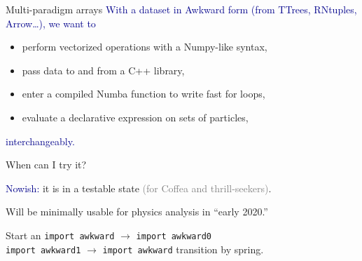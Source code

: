 \documentclass[aspectratio=169]{beamer}
\begin{document}
\begin{frame}{Multi-paradigm arrays}
\large
\vspace{0.75 cm}
\textcolor{darkblue}{With a dataset in Awkward form (from TTrees, RNtuples, Arrow\ldots), we want to}

\vspace{0.25 cm}
\begin{itemize}\setlength{\itemsep}{0.25 cm}
\item perform vectorized operations with a Numpy-like syntax,
\item pass data to and from a C++ library,
\item enter a compiled Numba function to write fast for loops,
\item evaluate a declarative expression on sets of particles,
\end{itemize}

\vspace{0.25 cm}
\textcolor{darkblue}{interchangeably.}

\vspace{0.5 cm}
\begin{center}
\end{center}
\end{frame}

\begin{frame}{When can I try it?}
\Large
\vspace{-0.25 cm}
\begin{center}
\end{center}

\vspace{0.25 cm}
\begin{center}
\textcolor{darkblue}{Nowish:} it is in a testable state \textcolor{gray}{(for Coffea and thrill-seekers)}.

\vspace{0.75 cm}
Will be minimally usable for physics analysis in ``early 2020.''

\vspace{0.75 cm}
\end{center}

Start an {\normalsize \texttt{import awkward}} $\to$ {\normalsize \texttt{import awkward0}} \\
\phantom{Start an} {\normalsize \texttt{import awkward1}} $\to$ {\normalsize \texttt{import awkward}} transition by spring.
\end{frame}
\end{document}
